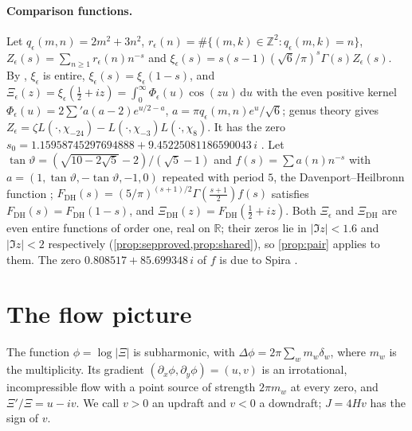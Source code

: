\documentclass[11pt]{article}
\theoremstyle{definition}\newtheorem{definition}[theorem]{Definition}
\theoremstyle{remark}\newtheorem{remark}[theorem]{Remark}
\newcommand{\R}{\mathbb R}\newcommand{\C}{\mathbb C}\newcommand{\N}{\mathbb N}
\newcommand{\dd}{\,\mathrm d}\newcommand{\e}{\mathrm e}
\begin{document}
\paragraph{Comparison functions.} Let $q_\epsilon(m,n)=2m^2+3n^2$, $r_\epsilon(n)=\#\{(m,k)\in\mathbb Z^2:q_\epsilon(m,k)=n\}$, $Z_\epsilon(s)=\sum_{n\ge1}r_\epsilon(n)n^{-s}$ and $\xi_\epsilon(s)=s(s-1)(\sqrt6/\pi)^s\Gamma(s)Z_\epsilon(s)$. By \cite[Lemma~16.1]{S01}, $\xi_\epsilon$ is entire, $\xi_\epsilon(s)=\xi_\epsilon(1-s)$, and $\Xi_\epsilon(z)=\xi_\epsilon(\frac12+iz)=\int_0^\infty\Phi_\epsilon(u)\cos(zu)\dd u$ with the even positive kernel $\Phi_\epsilon(u)=2\sum'a(a-2)e^{u/2-a}$, $a=\pi q_\epsilon(m,n)e^u/\sqrt6$; genus theory gives $Z_\epsilon=\zeta L(\cdot,\chi_{-24})-L(\cdot,\chi_{-3})L(\cdot,\chi_8)$. It has the zero $s_0=1.15958745297694888+9.45225081186590043\,i$ \cite{S01}. Let $\tan\vartheta=(\sqrt{10-2\sqrt5}-2)/(\sqrt5-1)$ and $f(s)=\sum a(n)n^{-s}$ with $a=(1,\tan\vartheta,-\tan\vartheta,-1,0)$ repeated with period $5$, the Davenport--Heilbronn function \cite{DH}; $F_{\mathrm{DH}}(s)=(5/\pi)^{(s+1)/2}\Gamma(\frac{s+1}2)f(s)$ satisfies $F_{\mathrm{DH}}(s)=F_{\mathrm{DH}}(1-s)$, and $\Xi_{\mathrm{DH}}(z)=F_{\mathrm{DH}}(\frac12+iz)$. Both $\Xi_\epsilon$ and $\Xi_{\mathrm{DH}}$ are even entire functions of order one, real on $\R$; their zeros lie in $|\Im z|<1.6$ and $|\Im z|<2$ respectively (\cref{prop:sepproved,prop:shared}), so \cref{prop:pair} applies to them. The zero $0.808517+85.699348\,i$ of $f$ is due to Spira \cite{Spira}.

\section{The flow picture}\label{sec:flow}

The function $\phi=\log|\Xi|$ is subharmonic, with $\Delta\phi=2\pi\sum_wm_w\delta_w$, where $m_w$ is the multiplicity. Its gradient $(\partial_x\phi,\partial_y\phi)=(u,v)$ is an irrotational, incompressible flow with a point source of strength $2\pi m_w$ at every zero, and $\Xi'/\Xi=u-iv$. We call $v>0$ an updraft and $v<0$ a downdraft; $J=4Hv$ has the sign of $v$.
\end{document}
